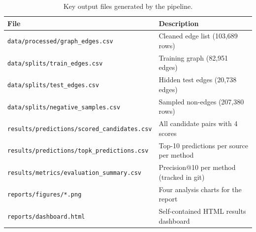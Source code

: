 \documentclass[10pt]{article}
\newcommand{\theadfont}{\bfseries\color{white}}
\begin{document}
\begin{appendices}
\begin{table}[H]
  \centering
  \caption{Key output files generated by the pipeline.}
  \label{tab:outputs}
  \small
  \begin{tabular}{l l}
    \hline
    \rowcolor{brandblue}
    \theadfont File & \theadfont Description \\
    \hline
    \rowcolor{lightblue}
    \texttt{data/processed/graph\_edges.csv}         & Cleaned edge list (103,689 rows) \\
    \texttt{data/splits/train\_edges.csv}            & Training graph (82,951 edges) \\
    \rowcolor{lightblue}
    \texttt{data/splits/test\_edges.csv}             & Hidden test edges (20,738 edges) \\
    \texttt{data/splits/negative\_samples.csv}       & Sampled non-edges (207,380 rows) \\
    \rowcolor{lightblue}
    \texttt{results/predictions/scored\_candidates.csv} & All candidate pairs with 4 scores \\
    \texttt{results/predictions/topk\_predictions.csv}  & Top-10 predictions per source per method \\
    \rowcolor{lightblue}
    \texttt{results/metrics/evaluation\_summary.csv} & Precision@10 per method (tracked in git) \\
    \texttt{reports/figures/*.png}                   & Four analysis charts for the report \\
    \rowcolor{lightblue}
    \texttt{reports/dashboard.html}                  & Self-contained HTML results dashboard \\
    \hline
  \end{tabular}
\end{table}

\end{appendices}
\end{document}
